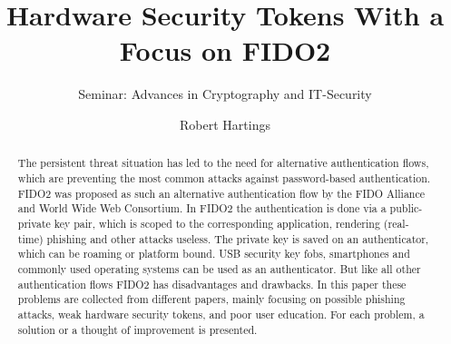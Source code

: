 \documentclass[runningheads]{llncs}
\begin{document}
%
\title{Hardware Security Tokens With a Focus on FIDO2}
\subtitle{Seminar: Advances in Cryptography and IT-Security}
%
%

\author{Robert Hartings}

%
\maketitle              %
\begin{abstract}
  The persistent threat situation has led to the need for alternative authentication flows, which are preventing the most common attacks against password-based authentication. FIDO2 was proposed as such an alternative authentication flow by the FIDO Alliance and World Wide Web Consortium. In FIDO2 the authentication is done via a public-private key pair, which is scoped to the corresponding application, rendering (real-time) phishing and other attacks useless. The private key is saved on an authenticator, which can be roaming or platform bound. USB security key fobs, smartphones and commonly used operating systems can be used as an authenticator. But like all other authentication flows FIDO2 has disadvantages and drawbacks. In this paper these problems are collected from different papers, mainly focusing on possible phishing attacks, weak hardware security tokens, and poor user education. For each problem, a solution or a thought of improvement is presented.

\end{abstract}
%
%
%
\end{document}
